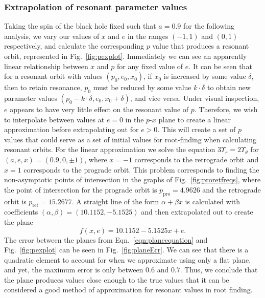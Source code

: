 \subsubsection{Extrapolation of resonant parameter values}
Taking the spin of the black hole fixed such that $a=0.9$ for the following analysis, we vary our values of $x$ and $e$ in the ranges $(-1,1)$ and $(0,1)$ respectively, and calculate the corresponding $p$ value that produces a resonant orbit, represented in Fig.~\eqref{fig:pexplot}.
Immediately we can see an apparently linear relationship between $x$ and $p$ for any fixed value of $e$.
It can be seen that for a resonant orbit with values $(p_0,e_0,x_0)$, if $x_0$ is increased by some value $\delta$, then to retain resonance, $p_0$ must be reduced by some value $k\cdot\delta$ to obtain new parameter values $(p_0-k\cdot\delta,e_0,x_0+\delta)$, and vice versa.
Under visual inspection, $e$ appears to have very little effect on the resonant value of $p$.
Therefore, we wish to interpolate between values at $e=0$ in the $p$-$x$ plane to create a linear approximation before extrapolating out for $e>0$.
This will create a set of $p$ values that could serve as a set of initial values for root-finding when calculating resonant orbits.
For the linear approximation we solve the equation $3\Upsilon_r=2\Upsilon_\theta$ for $(a,e,x)=(0.9,0,\pm 1)$, where $x=-1$ corresponds to the retrograde orbit and $x=1$ corresponds to the prograde orbit.
This problem corresponds to finding the non-asymptotic points of intersection in the graphs of Fig.~\eqref{fig:proretfreqs}, where the point of intersection for the prograde orbit is $p_\text{pro}=4.9626$ and the retrograde orbit is $p_\text{ret}=15.2677$.
A straight line of the form $\alpha+\beta x$ is calculated with coefficients $(\alpha,\beta)=(10.1152,-5.1525)$ and then extrapolated out to create the plane
\begin{equation}\label{eqn:planeequation}
    f(x,e)=10.1152-5.1525x+e.
\end{equation}
The error between the planes from Eqn.~\eqref{eqn:planeequation} and Fig.~\eqref{fig:pexplot} can be seen in Fig.~\eqref{fig:planeErr}.
We can see that there is a quadratic element to account for when we approximate using only a flat plane, and yet, the maximum error is only between $0.6$ and $0.7$.
Thus, we conclude that the plane produces values close enough to the true values that it can be considered a good method of approximation for resonant values in root finding.

